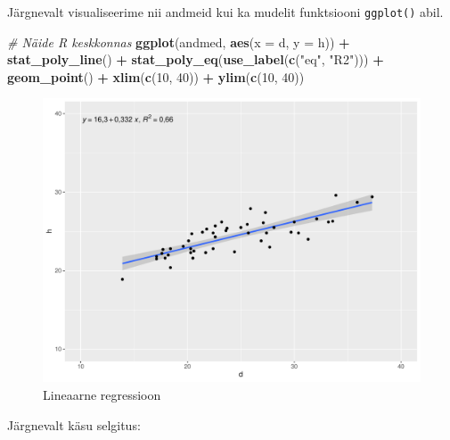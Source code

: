 \documentclass[
]{book}
\newenvironment{Shaded}{\begin{snugshade}}{\end{snugshade}}
\newcommand{\AttributeTok}[1]{\textcolor[rgb]{0.13,0.29,0.53}{#1}}
\newcommand{\CommentTok}[1]{\textcolor[rgb]{0.56,0.35,0.01}{\textit{#1}}}
\newcommand{\DecValTok}[1]{\textcolor[rgb]{0.00,0.00,0.81}{#1}}
\newcommand{\FunctionTok}[1]{\textcolor[rgb]{0.13,0.29,0.53}{\textbf{#1}}}
\newcommand{\NormalTok}[1]{#1}
\newcommand{\SpecialCharTok}[1]{\textcolor[rgb]{0.81,0.36,0.00}{\textbf{#1}}}
\newcommand{\StringTok}[1]{\textcolor[rgb]{0.31,0.60,0.02}{#1}}
\renewenvironment{Shaded} {\begin{snugshade}\footnotesize} {\end{snugshade}}
\begin{document}
Järgnevalt visualiseerime nii andmeid kui ka mudelit funktsiooni \texttt{ggplot()} abil.

\begin{Shaded}
\begin{Highlighting}[]
\CommentTok{\# Näide R keskkonnas}
\FunctionTok{ggplot}\NormalTok{(andmed, }\FunctionTok{aes}\NormalTok{(}\AttributeTok{x =}\NormalTok{ d, }\AttributeTok{y =}\NormalTok{ h)) }\SpecialCharTok{+}
  \FunctionTok{stat\_poly\_line}\NormalTok{() }\SpecialCharTok{+}
  \FunctionTok{stat\_poly\_eq}\NormalTok{(}\FunctionTok{use\_label}\NormalTok{(}\FunctionTok{c}\NormalTok{(}\StringTok{"eq"}\NormalTok{, }\StringTok{"R2"}\NormalTok{))) }\SpecialCharTok{+}
  \FunctionTok{geom\_point}\NormalTok{() }\SpecialCharTok{+}
  \FunctionTok{xlim}\NormalTok{(}\FunctionTok{c}\NormalTok{(}\DecValTok{10}\NormalTok{, }\DecValTok{40}\NormalTok{)) }\SpecialCharTok{+} \FunctionTok{ylim}\NormalTok{(}\FunctionTok{c}\NormalTok{(}\DecValTok{10}\NormalTok{, }\DecValTok{40}\NormalTok{))}
\end{Highlighting}
\end{Shaded}

\begin{figure}
\includegraphics[width=0.8\linewidth]{_main_files/figure-latex/unnamed-chunk-60-1} \caption{Lineaarne regressioon}\label{fig:unnamed-chunk-60}
\end{figure}

Järgnevalt käsu selgitus:
\end{document}
